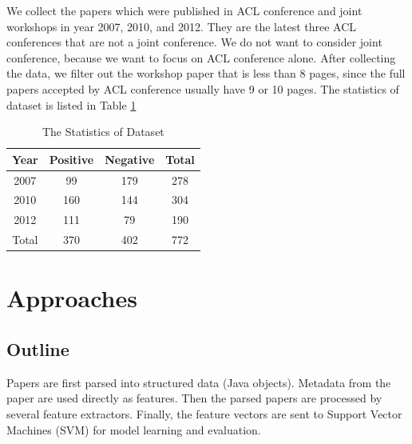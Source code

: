 \documentclass[11pt,letterpaper]{article}
\begin{document}
We collect the papers which were published in ACL conference and joint workshops in year 2007, 2010, and 2012. 
They are the latest three ACL conferences that are not a joint conference.
We do not want to consider joint conference, because we want to focus on ACL conference alone.
After collecting the data, we filter out the workshop paper that is less than 8 pages, since the full papers accepted by ACL conference usually have 9 or 10 pages.
The statistics of dataset is listed in Table \ref{tab:statistics} 

\begin{table}
\begin{center}
\begin{tabular}{|c|c|c|c|}
\hline 
Year & Positive &	Negative & Total\\ \hline 
2007 & 99  &	179 & 278\\ \hline	
2010 	& 160 &  144 & 304	\\ \hline
2012 	& 111 & 79 & 190 \\ \hline
Total & 370 & 402 & 772 \\\hline	
\end{tabular}
\end{center}
\label{tab:statistics}
\caption{The Statistics of Dataset}
\end{table}

\section{Approaches}
\subsection{Outline}
Papers are first parsed into structured data (Java objects). Metadata from the paper are used directly as features. 
Then the parsed papers are processed by several feature extractors. Finally, the feature vectors are sent to Support 
Vector Machines (SVM) for model learning and evaluation.
\end{document}
